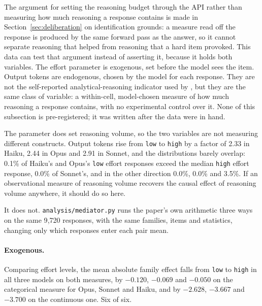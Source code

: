 \label{app:mediator}
The argument for setting the reasoning budget through the API rather than
measuring how much reasoning a response contains is made in
Section~\ref{sec:deliberation} on identification grounds: a measure read off
the response is produced by the same forward pass as the answer, so it cannot
separate reasoning that helped from reasoning that a hard item provoked. This
data can test that argument instead of asserting it, because it holds both
variables. The effort parameter is exogenous, set before the model sees the
item. Output tokens are endogenous, chosen by the model for each response.
They are not the self-reported analytical-reasoning indicator used by
\citet{bini2026behavioral}, but they are the same class of variable: a
within-cell, model-chosen measure of how much reasoning a response contains,
with no experimental control over it. None of this subsection is
pre-registered; it was written after the data were in hand.

The parameter does set reasoning volume, so the two variables are not
measuring different constructs. Output tokens rise from \texttt{low} to
\texttt{high} by a factor of 2.33 in Haiku, 2.44 in Opus and 2.91 in Sonnet,
and the distributions barely overlap: 0.1\% of Haiku's and Opus's
\texttt{low} effort responses exceed the median \texttt{high} effort
response, 0.0\% of Sonnet's, and in the other direction 0.0\%, 0.0\% and
3.5\%. If an observational measure of reasoning volume recovers the causal
effect of reasoning volume anywhere, it should do so here.

It does not. \texttt{analysis/mediator.py} runs the paper's own arithmetic
three ways on the same 9{,}720 responses, with the same families, items and
statistics, changing only which responses enter each pair mean.

\paragraph{Exogenous.} Comparing effort levels, the mean absolute family
effect falls from \texttt{low} to \texttt{high} in all three models on both
measures, by $-0.120$, $-0.069$ and $-0.050$ on the categorical measure for
Opus, Sonnet and Haiku, and by $-2.628$, $-3.667$ and $-3.700$ on the
continuous one. Six of six.

